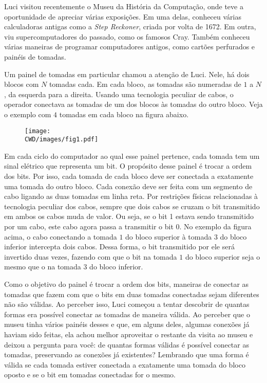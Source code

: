 Luci visitou recentemente o Museu da História da Computação, onde teve a oportunidade de apreciar várias exposições.
Em uma delas, conheceu várias calculadoras antigas como a \emph{Step Reckoner}, criada por volta de 1672.
 Em outra, viu supercomputadores do passado, como os famosos Cray.
 Também conheceu várias maneiras de programar computadores antigos, como cartões perfurados e painéis de tomadas.



Um painel de tomadas em particular chamou a atenção de Luci.
 Nele, há dois blocos com $N$ tomadas cada.
 Em cada bloco, as tomadas são numeradas de $1$ a $N$, da esquerda para a direita.
 Usando uma tecnologia peculiar de cabos, o operador conectava as tomadas de um dos blocos às tomadas do outro bloco.
 Veja o exemplo com $4$ tomadas em cada bloco na figura abaixo.

\begin{figure}[h]
\centering
\texttt{[image: \\CWD/images/fig1.pdf]}
\end{figure}

Em cada ciclo do computador ao qual esse painel pertence, cada tomada tem  um sinal elétrico que representa um bit.
 O propósito desse painel é trocar a ordem dos bits.
 Por isso, cada tomada de cada bloco deve ser conectada a exatamente uma tomada do outro bloco.
 Cada conexão deve ser feita com um segmento de cabo ligando as duas tomadas em linha reta.
 Por restrições físicas relacionadas à tecnologia peculiar dos cabos, sempre que dois cabos se cruzam o bit transmitido em ambos os cabos muda de valor.
 Ou seja, se o bit 1 estava sendo transmitido por um cabo, este cabo agora passa a transmitir o bit 0.
 No exemplo da figura acima, o cabo conectando a tomada $1$ do bloco superior à tomada $3$ do bloco inferior intercepta dois cabos.
 Dessa forma, o bit transmitido por ele será invertido duas vezes, fazendo com que o bit na tomada $1$ do bloco superior seja o mesmo que o na tomada $3$ do bloco inferior.


Como o objetivo do painel é trocar a ordem dos bits, maneiras de conectar as tomadas que fazem com que o bits em duas tomadas conectadas sejam diferentes não são válidas.
 Ao perceber isso, Luci começou a tentar descobrir de quantas formas era possível conectar as tomadas de maneira válida.
 Ao perceber que o museu tinha vários painéis desses e que, em alguns deles, algumas conexões já haviam sido feitas, ela achou melhor aproveitar o restante da visita ao museu e deixou a pergunta para você: de quantas formas válidas é possível conectar as tomadas, preservando as conexões já existentes?
Lembrando que uma forma é válida se cada tomada estiver conectada a exatamente uma tomada do bloco oposto e se o bit em tomadas conectadas for o mesmo.


